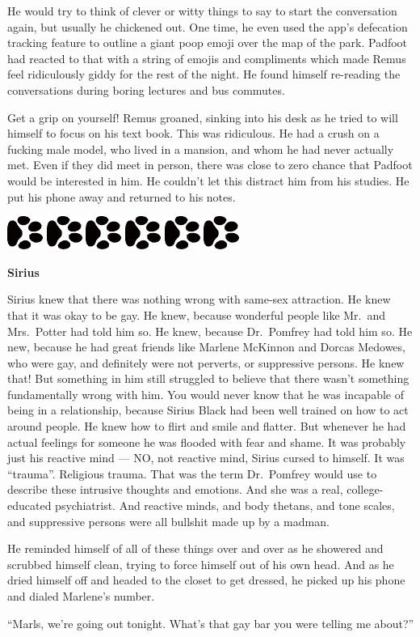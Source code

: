 \documentclass[12pt,twoside,openright]{memoir}
\newcommand{\myrulez}{	
	\begin{center}
		\hspace{.5em}
		\includegraphics[angle=60]{dogprint.pdf}
		\hspace{.5em}
		\includegraphics[angle=120]{dogprint.pdf}
		\hspace{.5em}
		\includegraphics[angle=60]{dogprint.pdf}
		\hspace{.5em}
		\includegraphics[angle=120]{dogprint.pdf}
		\hspace{.5em}
		\includegraphics[angle=60]{dogprint.pdf}
		\hspace{.5em}
		\includegraphics[angle=120]{dogprint.pdf}
		\hspace{.5em}
	\end{center}
}
\begin{document}
He would try to think of clever or witty things to say to start the conversation again, but usually he chickened out. One time, he even used the app's defecation tracking feature to outline a giant poop emoji over the map of the park. Padfoot had reacted to that with a string of emojis and compliments which made Remus feel ridiculously giddy for the rest of the night. He found himself re-reading the conversations during boring lectures and bus commutes.

Get a grip on yourself! Remus groaned, sinking into his desk as he tried to will himself to focus on his text book. This was ridiculous. He had a crush on a fucking male model, who lived in a mansion, and whom he had never actually met. Even if they did meet in person, there was close to zero chance that Padfoot would be interested in him. He couldn't let this distract him from his studies. He put his phone away and returned to his notes.

\myrulez

\textbf{Sirius} 

Sirius knew that there was nothing wrong with same-sex attraction. He knew that it was okay to be gay. He knew, because wonderful people like Mr.\ and Mrs.\ Potter had told him so. He knew, because Dr.\ Pomfrey had told him so. He new, because he had great friends like Marlene McKinnon and Dorcas Medowes, who were gay, and definitely were not perverts, or suppressive persons. He knew that! But something in him still struggled to believe that there wasn't something fundamentally wrong with him. You would never know that he was incapable of being in a relationship, because Sirius Black had been well trained on how to act around people. He knew how to flirt and smile and flatter. But whenever he had actual feelings for someone he was flooded with fear and shame. It was probably just his reactive mind --- NO, not reactive mind, Sirius cursed to himself. It was ``trauma''. Religious trauma. That was the term Dr.\ Pomfrey would use to describe these intrusive thoughts and emotions. And she was a real, college-educated psychiatrist. And reactive minds, and body thetans, and tone scales, and suppressive persons were all bullshit made up by a madman.

He reminded himself of all of these things over and over as he showered and scrubbed himself clean, trying to force himself out of his own head. And as he dried himself off and headed to the closet to get dressed, he picked up his phone and dialed Marlene's number.

``Marls, we're going out tonight. What's that gay bar you were telling me about?''
\end{document}

